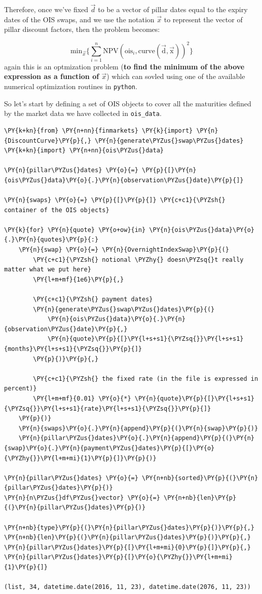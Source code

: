 Therefore, once we've fixed \(\vec{d}\) to be a vector of pillar dates equal to the expiry dates of the OIS swaps, and we use the notation \(\vec{x}\) to represent the vector of pillar discount factors, then the problem becomes:

\[\mathrm{min}_{\vec{x}} \Big\{\sum_{i=1}^{n}\mathrm{NPV}(\mathrm{ois}_i, \mathrm{curve(\vec{d}, \vec{x})})^2\Big\}\]
again this is an optmization problem (\textbf{to find the minimum of the above expression as a function of \(\vec{x}\)}) which can sovled using one of the available numerical optimization routines in \texttt{python}.

So let's start by defining a set of OIS objects to cover all the maturities defined by the market data we have collected in \texttt{ois\_data}.

\begin{Verbatim}[commandchars=\\\{\}]
\PY{k+kn}{from} \PY{n+nn}{finmarkets} \PY{k}{import} \PY{n}{DiscountCurve}\PY{p}{,} \PY{n}{generate\PYZus{}swap\PYZus{}dates}
\PY{k+kn}{import} \PY{n+nn}{ois\PYZus{}data}

\PY{n}{pillar\PYZus{}dates} \PY{o}{=} \PY{p}{[}\PY{n}{ois\PYZus{}data}\PY{o}{.}\PY{n}{observation\PYZus{}date}\PY{p}{]}

\PY{n}{swaps} \PY{o}{=} \PY{p}{[}\PY{p}{]} \PY{c+c1}{\PYZsh{} container of the OIS objects}

\PY{k}{for} \PY{n}{quote} \PY{o+ow}{in} \PY{n}{ois\PYZus{}data}\PY{o}{.}\PY{n}{quotes}\PY{p}{:}
    \PY{n}{swap} \PY{o}{=} \PY{n}{OvernightIndexSwap}\PY{p}{(}
        \PY{c+c1}{\PYZsh{} notional \PYZhy{} doesn\PYZsq{}t really matter what we put here}
        \PY{l+m+mf}{1e6}\PY{p}{,}
        
        \PY{c+c1}{\PYZsh{} payment dates}
        \PY{n}{generate\PYZus{}swap\PYZus{}dates}\PY{p}{(}
            \PY{n}{ois\PYZus{}data}\PY{o}{.}\PY{n}{observation\PYZus{}date}\PY{p}{,}
            \PY{n}{quote}\PY{p}{[}\PY{l+s+s1}{\PYZsq{}}\PY{l+s+s1}{months}\PY{l+s+s1}{\PYZsq{}}\PY{p}{]}
        \PY{p}{)}\PY{p}{,}
        
        \PY{c+c1}{\PYZsh{} the fixed rate (in the file is expressed in percent)}
        \PY{l+m+mf}{0.01} \PY{o}{*} \PY{n}{quote}\PY{p}{[}\PY{l+s+s1}{\PYZsq{}}\PY{l+s+s1}{rate}\PY{l+s+s1}{\PYZsq{}}\PY{p}{]}
    \PY{p}{)}
    \PY{n}{swaps}\PY{o}{.}\PY{n}{append}\PY{p}{(}\PY{n}{swap}\PY{p}{)}
    \PY{n}{pillar\PYZus{}dates}\PY{o}{.}\PY{n}{append}\PY{p}{(}\PY{n}{swap}\PY{o}{.}\PY{n}{payment\PYZus{}dates}\PY{p}{[}\PY{o}{\PYZhy{}}\PY{l+m+mi}{1}\PY{p}{]}\PY{p}{)}
    
\PY{n}{pillar\PYZus{}dates} \PY{o}{=} \PY{n+nb}{sorted}\PY{p}{(}\PY{n}{pillar\PYZus{}dates}\PY{p}{)}
\PY{n}{n\PYZus{}df\PYZus{}vector} \PY{o}{=} \PY{n+nb}{len}\PY{p}{(}\PY{n}{pillar\PYZus{}dates}\PY{p}{)}

\PY{n+nb}{type}\PY{p}{(}\PY{n}{pillar\PYZus{}dates}\PY{p}{)}\PY{p}{,} \PY{n+nb}{len}\PY{p}{(}\PY{n}{pillar\PYZus{}dates}\PY{p}{)}\PY{p}{,} \PY{n}{pillar\PYZus{}dates}\PY{p}{[}\PY{l+m+mi}{0}\PY{p}{]}\PY{p}{,} \PY{n}{pillar\PYZus{}dates}\PY{p}{[}\PY{o}{\PYZhy{}}\PY{l+m+mi}{1}\PY{p}{]}

(list, 34, datetime.date(2016, 11, 23), datetime.date(2076, 11, 23))
\end{Verbatim}

